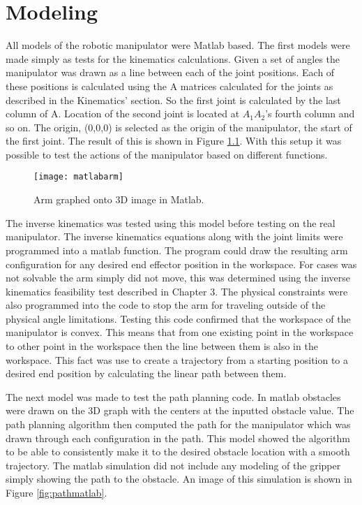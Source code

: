 \chapter{Modeling}
All models of the robotic manipulator were Matlab based. The first models were made simply as tests for the kinematics calculations. Given a set of angles the manipulator was drawn as a line between each of the joint positions. Each of these positions is calculated using the A matrices calculated for the joints as described in the Kinematics' section. So the first joint is calculated by the last column of A. Location of the second joint is located at $A_1A_2$'s fourth column and so on. The origin, (0,0,0) is selected as the origin of the manipulator, the start of the first joint. The result of this is shown in Figure \ref{fig:matlab}. With this setup it was possible to test the actions of the manipulator based on different functions.

\begin{figure}
\centering
\texttt{[image: matlabarm]}
\caption{Arm graphed onto 3D image in Matlab.}
\label{fig:matlab}
\end{figure}

The inverse kinematics was tested using this model before testing on the real manipulator. The inverse kinematics equations along with the joint limits were programmed into a matlab function. The program could draw the resulting arm configuration for any desired end effector position in the workspace. For cases was not solvable the arm simply did not move, this was determined using the inverse kinematics feasibility test described in Chapter 3. The physical constraints were also programmed into the code to stop the arm for traveling outside of the physical angle limitations. Testing this code confirmed that the workspace of the manipulator is convex. This means that from one existing point in the workspace to other point in the workspace then the line between them is also in the workspace. This fact was use to create a trajectory from a starting position to a desired end position by calculating the linear path between them.

The next model was made to test the path planning code. In matlab obstacles were drawn on the 3D graph with the centers at the inputted obstacle value. The path planning algorithm then computed the path for the manipulator which was drawn through each configuration in the path. This model showed the algorithm to be able to consistently make it to the desired obstacle location with a smooth trajectory. The matlab simulation did not include any modeling of the gripper simply showing the path to the obstacle. An image of this simulation is shown in Figure \ref{fig:pathmatlab}.

